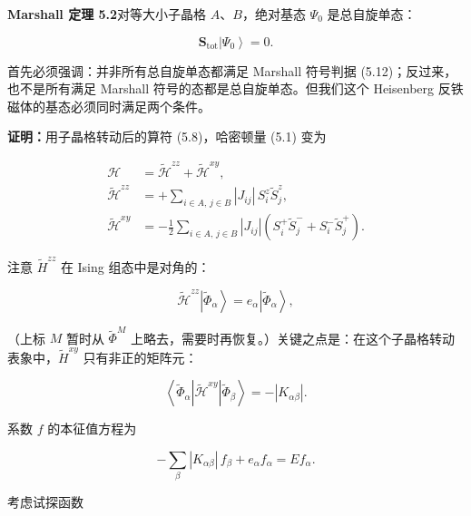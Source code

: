 \medskip
\noindent\textbf{Marshall 定理 5.2}\quad 对等大小子晶格 $A$、$B$，绝对基态 $\Psi_0$ 是总自旋单态：

\begin{equation*}
\mathbf {S} _ {\mathrm{tot}} \left| \Psi_ {0} \right\rangle = 0.
\tag{5.14}
\end{equation*}
\medskip

首先必须强调：并非所有总自旋单态都满足 Marshall 符号判据 (5.12)；反过来，也不是所有满足 Marshall 符号的态都是总自旋单态。但我们这个 Heisenberg 反铁磁体的基态必须同时满足两个条件。

\textbf{证明：}用子晶格转动后的算符 (5.8)，哈密顿量 (5.1) 变为

\begin{align*}
\mathcal {H} & = \tilde {\mathcal {H}} ^ {zz} + \tilde {\mathcal {H}} ^ {xy} ,\\
\tilde {\mathcal {H}} ^ {zz} & = + \sum_ {i \in A,\, j \in B} | J _ {ij} | \, S _ {i} ^ {z} \tilde {S} _ {j} ^ {z} ,\\
\tilde {\mathcal {H}} ^ {xy} & = - \frac {1}{2} \sum_ {i \in A,\, j \in B} | J _ {ij} | \left( S _ {i} ^ {+} \tilde {S} _ {j} ^ {-} + S _ {i} ^ {-} \tilde {S} _ {j} ^ {+} \right) .
\tag{5.15}
\end{align*}

注意 $\tilde{H}^{zz}$ 在 Ising 组态中是对角的：

\begin{equation*}
\tilde {\mathcal {H}} ^ {zz} \left| \tilde {\Phi} _ {\alpha} \right\rangle = e _ {\alpha} \left| \tilde {\Phi} _ {\alpha} \right\rangle ,
\tag{5.16}
\end{equation*}

（上标 $M$ 暂时从 $\tilde{\Phi}^{M}$ 上略去，需要时再恢复。）关键之点是：在这个子晶格转动表象中，$\tilde{H}^{xy}$ 只有非正的矩阵元：

\begin{equation*}
\left\langle \tilde {\Phi} _ {\alpha} \left| \tilde {\mathcal {H}} ^ {xy} \right| \tilde {\Phi} _ {\beta} \right\rangle = - \left| K _ {\alpha \beta} \right| .
\tag{5.17}
\end{equation*}

系数 $f$ 的本征值方程为

\begin{equation*}
- \sum_ {\beta} | K _ {\alpha \beta} | \, f _ {\beta} + e _ {\alpha} f _ {\alpha} = E f _ {\alpha}.
\tag{5.18}
\end{equation*}

考虑试探函数

